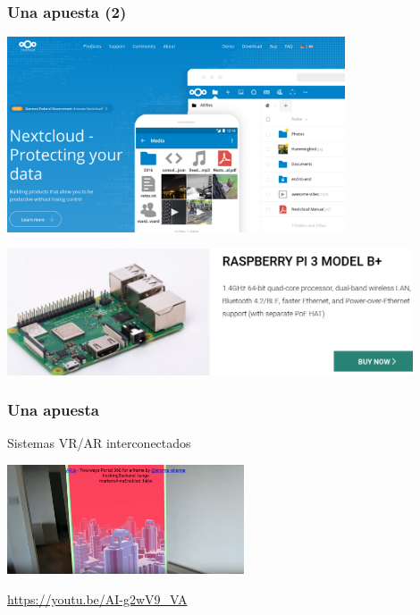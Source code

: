 \documentclass[17pt,aspectratio=169,hyperref=pdfusetitle]{beamer}
\begin{document}
\begin{frame}[fragile]
  \frametitle{Una apuesta (2)}

  \begin{center}
  \includegraphics[width=10cm]{figs/nextcloud}
  \end{center}
  
\end{frame}

\begin{frame}[fragile]

  \begin{center}
  \includegraphics[width=12cm]{figs/raspberry-pi}
  \end{center}

  
\end{frame}


\begin{frame}[fragile]
  \frametitle{Una apuesta}

  Sistemas VR/AR interconectados

  \begin{center}
  \includegraphics[width=7cm]{figs/aframe-portal}
  \end{center}

  {\small
  \url{https://youtu.be/AI-g2wV9_VA}
  }
  
\end{frame}
\end{document}
